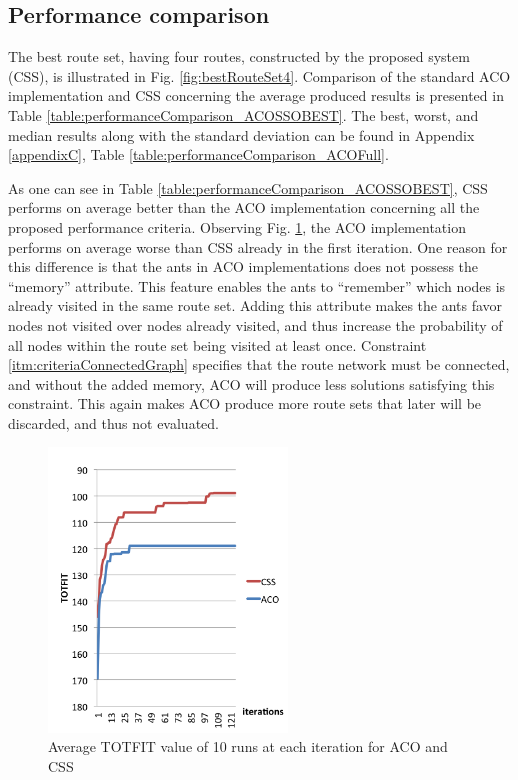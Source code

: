 \subsection{Performance comparison}
\label{subsec:performanceComparisonDiscussion}


The best route set, having four routes, constructed by the proposed system (CSS), is illustrated in Fig. \vref{fig:bestRouteSet4}. Comparison of the standard ACO implementation and CSS concerning the average produced results is presented in Table \vref{table:performanceComparison_ACOSSOBEST}. The best, worst, and median results along with the standard deviation can be found in Appendix \ref{appendixC}, Table \vref{table:performanceComparison_ACOFull}. 

As one can see in Table \vref{table:performanceComparison_ACOSSOBEST}, CSS performs on average better than the ACO implementation concerning all the proposed performance criteria. Observing Fig. \ref{fig:acovssso}, the ACO implementation performs on average worse than CSS already in the first iteration. One reason for this difference is that the ants in ACO implementations does not possess the ``memory'' attribute. This feature enables the ants to ``remember'' which nodes is already visited in the same route set. Adding this attribute makes the ants favor nodes not visited over nodes already visited, and thus increase the probability of all nodes within the route set being visited at least once. Constraint \vref{itm:criteriaConnectedGraph} specifies that the route network must be connected, and without the added memory, ACO will produce less solutions satisfying this constraint. This again makes ACO produce more route sets that later will be discarded, and thus not evaluated. %

 \begin{figure}[H]
    \begin{center}
    \includegraphics[width=2.5in]{assets/acovsssoNEW.png}
    \end{center}
    \caption{Average TOTFIT value of 10 runs at each iteration for ACO and CSS}
    \label{fig:acovssso} 
\end{figure}

